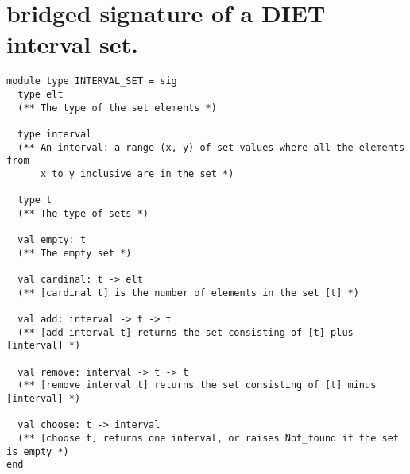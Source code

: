 \section{bridged signature of a DIET interval set.}
\label{app:diet-sig}

\centering
\begin{verbatim}
module type INTERVAL_SET = sig
  type elt
  (** The type of the set elements *)

  type interval
  (** An interval: a range (x, y) of set values where all the elements from
      x to y inclusive are in the set *)

  type t
  (** The type of sets *)

  val empty: t
  (** The empty set *)

  val cardinal: t -> elt
  (** [cardinal t] is the number of elements in the set [t] *)

  val add: interval -> t -> t
  (** [add interval t] returns the set consisting of [t] plus [interval] *)

  val remove: interval -> t -> t
  (** [remove interval t] returns the set consisting of [t] minus [interval] *)

  val choose: t -> interval
  (** [choose t] returns one interval, or raises Not_found if the set is empty *)
end
\end{verbatim}
